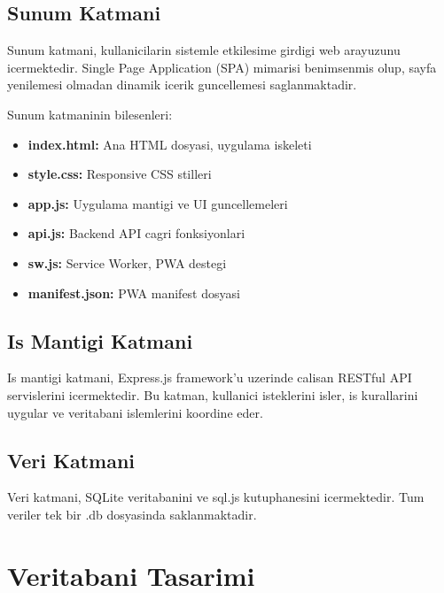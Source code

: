 \subsection{Sunum Katmani}
\label{subsec:sunum-katmani}

Sunum katmani, kullanicilarin sistemle etkilesime girdigi web 
arayuzunu icermektedir. Single Page Application (SPA) mimarisi 
benimsenmis olup, sayfa yenilemesi olmadan dinamik icerik 
guncellemesi saglanmaktadir.

Sunum katmaninin bilesenleri:

\begin{itemize}
    \item \textbf{index.html:} Ana HTML dosyasi, uygulama iskeleti
    \item \textbf{style.css:} Responsive CSS stilleri
    \item \textbf{app.js:} Uygulama mantigi ve UI guncellemeleri
    \item \textbf{api.js:} Backend API cagri fonksiyonlari
    \item \textbf{sw.js:} Service Worker, PWA destegi
    \item \textbf{manifest.json:} PWA manifest dosyasi
\end{itemize}

\subsection{Is Mantigi Katmani}
\label{subsec:is-mantigi-katmani}

Is mantigi katmani, Express.js framework'u uzerinde calisan 
RESTful API servislerini icermektedir. Bu katman, kullanici 
isteklerini isler, is kurallarini uygular ve veritabani 
islemlerini koordine eder.

\subsection{Veri Katmani}
\label{subsec:veri-katmani}

Veri katmani, SQLite veritabanini ve sql.js kutuphanesini 
icermektedir. Tum veriler tek bir .db dosyasinda 
saklanmaktadir.

\section{Veritabani Tasarimi}
\label{sec:veritabani-tasarimi}

